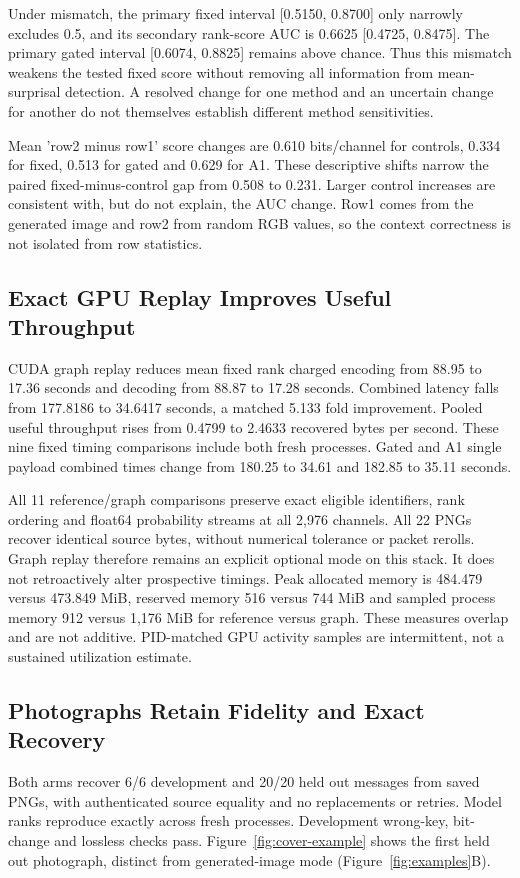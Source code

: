 \documentclass[a4paper,twoside]{article}
\begin{document}
Under mismatch, the primary fixed interval [0.5150, 0.8700] only narrowly excludes 0.5, and its secondary rank-score AUC is 0.6625 [0.4725, 0.8475]. The primary gated interval [0.6074, 0.8825] remains above chance. Thus this mismatch weakens the tested fixed score without removing all information from mean-surprisal detection. A resolved change for one method and an uncertain change for another do not themselves establish different method sensitivities.

Mean 'row2 minus row1' score changes are 0.610 bits/channel for controls, 0.334 for fixed, 0.513 for gated and 0.629 for A1. These descriptive shifts narrow the paired fixed-minus-control gap from 0.508 to 0.231. Larger control increases are consistent with, but do not explain, the AUC change. Row1 comes from the generated image and row2 from random RGB values, so the context correctness is not isolated from row statistics.

\subsection{Exact GPU Replay Improves Useful Throughput}
CUDA graph replay reduces mean fixed rank charged encoding from 88.95 to 17.36 seconds and decoding from 88.87 to 17.28 seconds. Combined latency falls from 177.8186 to 34.6417 seconds, a matched 5.133 fold improvement. Pooled useful throughput rises from 0.4799 to 2.4633 recovered bytes per second. These nine fixed timing comparisons include both fresh processes. Gated and A1 single payload combined times change from 180.25 to 34.61 and 182.85 to 35.11 seconds.

All 11 reference/graph comparisons preserve exact eligible identifiers, rank ordering and float64 probability streams at all 2,976 channels. All 22 PNGs recover identical source bytes, without numerical tolerance or packet rerolls. Graph replay therefore remains an explicit optional mode on this stack. It does not retroactively alter prospective timings. Peak allocated memory is 484.479 versus 473.849 MiB, reserved memory 516 versus 744 MiB and sampled process memory 912 versus 1,176 MiB for reference versus graph. These measures overlap and are not additive. PID-matched GPU activity samples are intermittent, not a sustained utilization estimate.

\space

\subsection{Photographs Retain Fidelity and Exact Recovery}
\label{sec:cover-results}
Both arms recover 6/6 development and 20/20 held out messages from saved PNGs, with authenticated source equality and no replacements or retries. Model ranks reproduce exactly across fresh processes. Development wrong-key, bit-change and lossless checks pass. Figure~\ref{fig:cover-example} shows the first held out photograph, distinct from generated-image mode (Figure~\ref{fig:examples}B).
\end{document}
